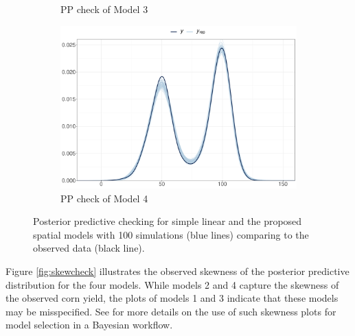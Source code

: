 \documentclass[a4paper]{article}   	%
\begin{document}
\begin{figure}[!htp]
\begin{subfigure}[t]{0.45\textwidth}
			\caption{PP check of Model 3}
		\end{subfigure}
		\begin{subfigure}[t]{0.45\textwidth}
			\includegraphics[width=\linewidth]{Images/ppcheck_STRand}
			\caption{PP check of Model 4}
		\end{subfigure}
		\caption{Posterior predictive checking for simple linear and the proposed spatial models with 100 simulations (blue lines) comparing to the observed data (black line).}\label{fig:ppcheck}
	\end{figure}
	
	
	Figure \ref{fig:skewcheck} illustrates the observed skewness of the posterior predictive distribution for the four models. While models 2 and 4 capture the skewness of the observed corn yield, the plots of models 1 and 3 indicate that these models may be misspecified. See \textcite[p.~397]{gabry2019Visualization} for more details on the use of such skewness plots for model selection in a Bayesian workflow.
	
\end{document}
